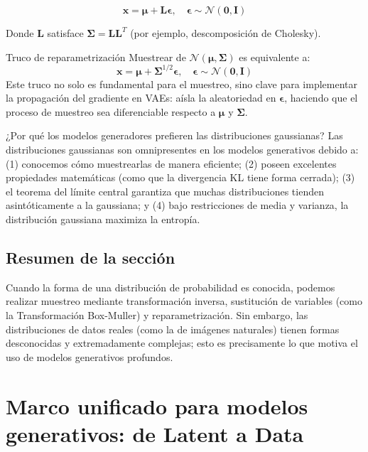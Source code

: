 \documentclass[a4paper]{article}
\begin{document}
$$\mathbf{x} = \boldsymbol{\mu} + \mathbf{L} \boldsymbol{\epsilon}, \quad \boldsymbol{\epsilon} \sim \mathcal{N}(\mathbf{0}, \mathbf{I})$$

Donde $\mathbf{L}$ satisface $\boldsymbol{\Sigma} = \mathbf{L}\mathbf{L}^T$ (por ejemplo, descomposición de Cholesky).

\begin{importantbox}{Truco de reparametrización}
Muestrear de $\mathcal{N}(\boldsymbol{\mu}, \boldsymbol{\Sigma})$ es equivalente a:
$$\mathbf{x} = \boldsymbol{\mu} + \boldsymbol{\Sigma}^{1/2} \boldsymbol{\epsilon}, \quad \boldsymbol{\epsilon} \sim \mathcal{N}(\mathbf{0}, \mathbf{I})$$
Este truco no solo es fundamental para el muestreo, sino clave para implementar la propagación del gradiente en VAEs: aísla la aleatoriedad en $\boldsymbol{\epsilon}$, haciendo que el proceso de muestreo sea diferenciable respecto a $\boldsymbol{\mu}$ y $\boldsymbol{\Sigma}$.
\end{importantbox}

\begin{knowledgebox}{¿Por qué los modelos generadores prefieren las distribuciones gaussianas?}
Las distribuciones gaussianas son omnipresentes en los modelos generativos debido a: (1) conocemos cómo muestrearlas de manera eficiente; (2) poseen excelentes propiedades matemáticas (como que la divergencia KL tiene forma cerrada); (3) el teorema del límite central garantiza que muchas distribuciones tienden asintóticamente a la gaussiana; y (4) bajo restricciones de media y varianza, la distribución gaussiana maximiza la entropía.
\end{knowledgebox}

\subsection{Resumen de la sección}

Cuando la forma de una distribución de probabilidad es conocida, podemos realizar muestreo mediante transformación inversa, sustitución de variables (como la Transformación Box-Muller) y reparametrización. Sin embargo, las distribuciones de datos reales (como la de imágenes naturales) tienen formas desconocidas y extremadamente complejas; esto es precisamente lo que motiva el uso de modelos generativos profundos.

\newpage
\section{Marco unificado para modelos generativos: de Latent a Data}
\end{document}
